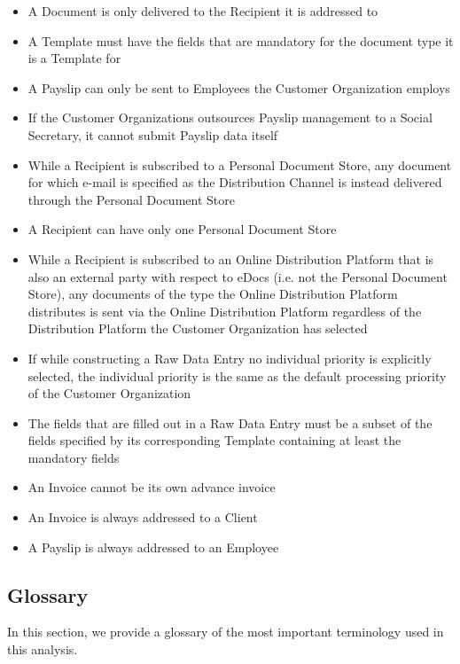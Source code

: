 \documentclass[a4paper,10pt]{article}
\begin{document}
\begin{itemize}
    \item A Document is only delivered to the Recipient it is addressed to
    \item A Template must have the fields that are mandatory for the document type it is a Template for
    \item A Payslip can only be sent to Employees the Customer Organization employs
    \item If the Customer Organizations outsources Payslip management to a Social Secretary, it cannot submit Payslip data itself
    \item While a Recipient is subscribed to a Personal Document Store, any document for which e-mail is specified as the Distribution Channel is instead delivered through the Personal Document Store
    \item A Recipient can have only one Personal Document Store
    \item While a Recipient is subscribed to an Online Distribution Platform that is also an external party with respect to eDocs (i.e. not the Personal Document Store), any documents of the type the Online Distribution Platform distributes is sent via the Online Distribution Platform regardless of the Distribution Platform the Customer Organization has selected
    \item If while constructing a Raw Data Entry no individual priority is explicitly selected, the individual priority is the same as the default processing priority of the Customer Organization
    \item The fields that are filled out in a Raw Data Entry must be a subset of the fields specified by its corresponding Template containing at least the mandatory fields
    \item An Invoice cannot be its own advance invoice
    \item An Invoice is always addressed to a Client
    \item A Payslip is always addressed to an Employee
\end{itemize}

\subsection{Glossary}
In this section, we provide a glossary of the most important terminology used
in this analysis.
\end{document}
